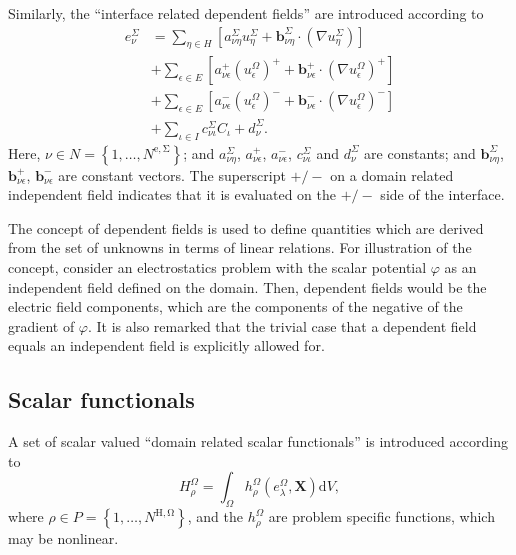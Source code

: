 \documentclass[pdftex,a4paper,12pt,abstracton]{scrartcl}
\begin{document}
Similarly, the ``interface related dependent fields'' are introduced according to
\begin{equation}
\begin{split}
e^\Sigma_\nu &=  \sum_{\eta \in H} \left[ a^\Sigma_{\nu\eta} u^\Sigma_\eta + \boldsymbol{b}^\Sigma_{\nu\eta} \cdot (\nabla u^\Sigma_\eta) \right]\\
             & + \sum_{\epsilon \in E} \left[ a^+_{\nu\epsilon} (u^\Omega_\epsilon)^+ + \boldsymbol{b}^+_{\nu\epsilon} \cdot (\nabla u^\Omega_\epsilon)^+ \right]\\
             & + \sum_{\epsilon \in E} \left[ a^-_{\nu\epsilon} (u^\Omega_\epsilon)^- + \boldsymbol{b}^-_{\nu\epsilon} \cdot (\nabla u^\Omega_\epsilon)^- \right]\\
             & + \sum_{\iota \in I}c^\Sigma_{\nu\iota} C_\iota + d^\Sigma_\nu.
\end{split}
\label{dependent_field_interface}
\end{equation}
Here, $\nu \in N=\left\{1, \hdots, N^\mathrm{e,\Sigma}\right\}$; and $a^\Sigma_{\nu\eta}$, $a^+_{\nu\epsilon}$, $a^-_{\nu\epsilon}$,  $c^\Sigma_{\nu\iota}$ and $d^\Sigma_\nu$ are constants; and $\boldsymbol{b}^\Sigma_{\nu\eta}$, $\boldsymbol{b}^+_{\nu\epsilon}$, $\boldsymbol{b}^-_{\nu\epsilon}$ are constant vectors. The superscript $+/-$ on a domain related independent field indicates that it is evaluated on the $+/-$ side of the interface.

The concept of dependent fields is used to define quantities which are derived from the set of unknowns in terms of linear relations. For illustration of the concept, consider an electrostatics problem with the scalar potential $\varphi$ as an independent field defined on the domain. Then, dependent fields would be the electric field components, which are the components of the negative of the gradient of $\varphi$. It is also remarked that the trivial case that a dependent field equals an independent field  is explicitly allowed for.

\subsection{Scalar functionals}
A set of scalar valued ``domain related scalar functionals'' is introduced according to
\begin{equation}
H^\Omega_\rho = \int_\Omega h^\Omega_\rho(e^\Omega_\lambda, \boldsymbol{X}) \mathrm{d}V,
\end{equation}
where $\rho \in P=\left\{1, \hdots, N^\mathrm{H,\Omega}\right\}$, and the $h^\Omega_\rho$ are problem specific functions, which may be nonlinear.
\end{document}

